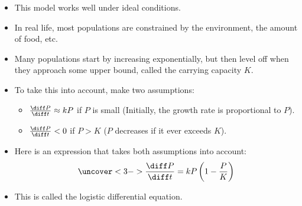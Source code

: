 \begin{frame}
\begin{itemize}
\item  This model works well under ideal conditions.
\item  In real life, most populations are constrained by the environment, the amount of food, etc.
\item  Many populations start by increasing exponentially, but then level off when they approach some upper bound, called the carrying capacity $K$.
\item<2->  To take this into account, make two assumptions:
\begin{itemize}
\item<2->  $\frac{\diff P}{\diff t} \approx kP$ if $P$ is small (Initially, the growth rate is proportional to $P$).
\item<2->  $\frac{\diff P}{\diff t} < 0$ if $P > K$ ($P$ decreases if it ever exceeds $K$).
\end{itemize}
\item<3->  Here is an expression that takes both assumptions into account:
\[
\uncover<3->{%
\frac{\diff P}{\diff t} = kP\left( 1 - \frac{P}{K}\right)
}%
\]
\item<4->  This is called the logistic differential equation.
\end{itemize}
\end{frame}

